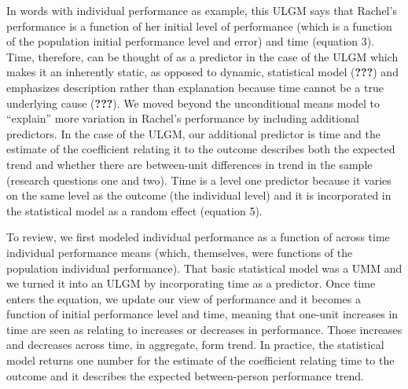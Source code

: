 \documentclass[english,,man]{apa6}
\begin{document}
In words with individual performance as example, this ULGM says that Rachel's performance is a function of her initial level of performance (which is a function of the population initial performance level and error) and time (equation 3). Time, therefore, can be thought of as a predictor in the case of the ULGM which makes it an inherently static, as opposed to dynamic, statistical model ({\textbf{???}}) and emphasizes description rather than explanation because time cannot be a true underlying cause ({\textbf{???}}). We moved beyond the unconditional means model to \enquote{explain} more variation in Rachel's performance by including additional predictors. In the case of the ULGM, our additional predictor is time and the estimate of the coefficient relating it to the outcome describes both the expected trend and whether there are between-unit differences in trend in the sample (research questions one and two). Time is a level one predictor because it varies on the same level as the outcome (the individual level) and it is incorporated in the statistical model as a random effect (equation 5).

To review, we first modeled individual performance as a function of across time individual performance means (which, themselves, were functions of the population individual performance). That basic statistical model was a UMM and we turned it into an ULGM by incorporating time as a predictor. Once time enters the equation, we update our view of performance and it becomes a function of initial performance level and time, meaning that one-unit increases in time are seen as relating to increases or decreases in performance. Those increases and decreases across time, in aggregate, form trend. In practice, the statistical model returns one number for the estimate of the coefficient relating time to the outcome and it describes the expected between-person performance trend.
\end{document}
